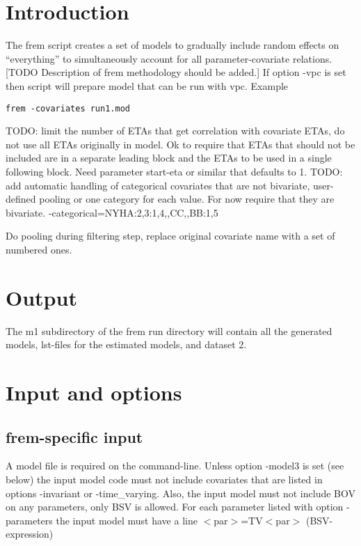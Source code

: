 



\maketitle


\section{Introduction}

The frem script creates a set of models to gradually include random effects on “everything” to simultaneously account for all parameter-covariate relations. [TODO Description of frem methodology should be added.] If option -vpc is set then script will prepare model that can be run with vpc.
Example
\begin{verbatim}
frem -covariates run1.mod
\end{verbatim}


TODO: limit the number of ETAs that get correlation with covariate ETAs, do not use all ETAs originally in model. Ok to require that ETAs that should not be included are in a separate leading block and the ETAs to be used in a single following block. Need parameter start-eta or similar that defaults to 1.
TODO: add automatic handling of categorical covariates that are not bivariate, user-defined pooling or one category for each value. For now require that they are bivariate.
 -categorical=NYHA:2,3:1,4,,CC,,BB:1,5

Do pooling during filtering step, replace original covariate name with a set of numbered ones. 


\section{Output}
The m1 subdirectory of the frem run directory will contain all the generated models, lst-files for the estimated models, and dataset 2.

\section{Input and options}
\subsection{frem-specific input}
A model file is required on the command-line. Unless option -model3 is set (see below) the input model code must not include covariates that are listed in options -invariant or -time\_varying. Also, the input model must not include  BOV on any parameters, only BSV is allowed. For each parameter listed with option -parameters the input model must have a line 
$<$par$>$=TV$<$par$>$ (BSV-expression)

